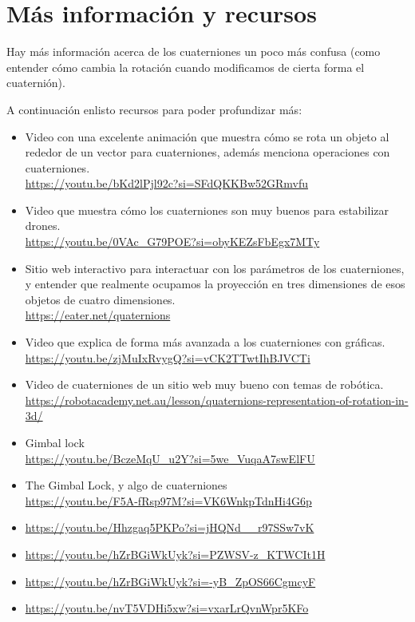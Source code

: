 \section{Más información y recursos}
Hay más información acerca de los cuaterniones un poco más confusa (como entender cómo cambia la rotación cuando modificamos de cierta forma el cuaternión). 

A continuación enlisto recursos para poder profundizar más:

\begin{itemize}

    \item Video con una excelente animación que muestra cómo se rota un objeto al rededor de un vector para cuaterniones, además menciona operaciones con cuaterniones.\\ 
    \url{https://youtu.be/bKd2lPjl92c?si=SFdQKKBw52GRmvfu}
    \item Video que muestra cómo los cuaterniones son muy buenos para estabilizar drones.\\
    \url{https://youtu.be/0VAc_G79POE?si=obyKEZsFbEgx7MTy}
    \item Sitio web interactivo para interactuar con los parámetros de los cuaterniones, y entender que realmente ocupamos la proyección en tres dimensiones de esos objetos de cuatro dimensiones.\\
    \url{https://eater.net/quaternions}
    \item Video que explica de forma más avanzada a los cuaterniones con gráficas.\\
    \url{https://youtu.be/zjMuIxRvygQ?si=vCK2TTwtIhBJVCTi}
    \item Video de cuaterniones de un sitio web muy bueno con temas de robótica.\\
    \url{https://robotacademy.net.au/lesson/quaternions-representation-of-rotation-in-3d/}
    \item Gimbal lock\\
    \url{https://youtu.be/BczeMqU_u2Y?si=5we_VuqaA7swElFU}
    \item The Gimbal Lock, y algo de cuaterniones\\
    \url{https://youtu.be/F5A-fRsp97M?si=VK6WnkpTdnHi4G6p}
    \item \url{https://youtu.be/Hhzgaq5PKPo?si=jHQNd__r97SSw7vK}
    \item \url{https://youtu.be/hZrBGiWkUyk?si=PZWSV-z_KTWCIt1H}
    \item \url{https://youtu.be/hZrBGiWkUyk?si=-yB_ZpOS66CgmcyF}
    \item \url{https://youtu.be/nvT5VDHi5xw?si=vxarLrQvnWpr5KFo}
\end{itemize}
